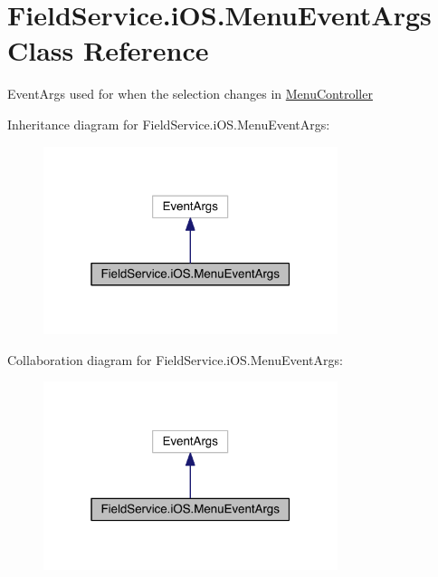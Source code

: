 \hypertarget{class_field_service_1_1i_o_s_1_1_menu_event_args}{\section{Field\+Service.\+i\+O\+S.\+Menu\+Event\+Args Class Reference}
\label{class_field_service_1_1i_o_s_1_1_menu_event_args}
}


Event\+Args used for when the selection changes in \hyperlink{class_field_service_1_1i_o_s_1_1_menu_controller}{Menu\+Controller}  




Inheritance diagram for Field\+Service.\+i\+O\+S.\+Menu\+Event\+Args\+:
\nopagebreak
\begin{figure}[H]
\begin{center}
\leavevmode
\includegraphics[width=244pt]{class_field_service_1_1i_o_s_1_1_menu_event_args__inherit__graph}
\end{center}
\end{figure}


Collaboration diagram for Field\+Service.\+i\+O\+S.\+Menu\+Event\+Args\+:
\nopagebreak
\begin{figure}[H]
\begin{center}
\leavevmode
\includegraphics[width=244pt]{class_field_service_1_1i_o_s_1_1_menu_event_args__coll__graph}
\end{center}
\end{figure}
